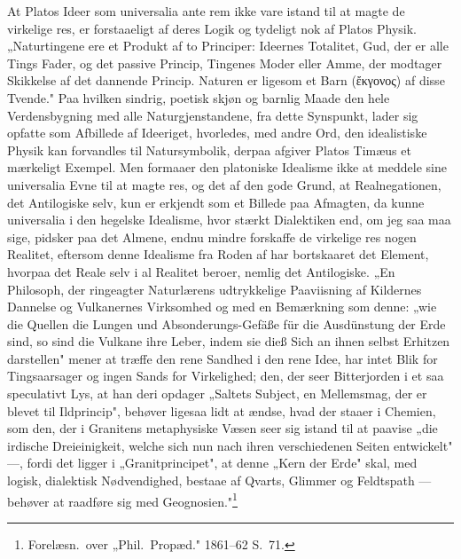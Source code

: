 \documentclass[12pt]{book}
\newcommand{\opage}[1]{\marginnote{\footnotesize\textit{[#1]}}}
\begin{document}
At Platos Ideer som universalia ante rem ikke vare istand til at magte de virkelige res, er
forstaaeligt af deres Logik og tydeligt nok af Platos Physik. „Naturtingene ere et Produkt af to
Principer: Ideernes Totalitet, Gud, der er alle Tings Fader, og det passive Princip, Tingenes
Moder eller Amme, der modtager Skikkelse af det dannende Princip. Naturen er ligesom et Barn
(ἔκγονος) af disse Tvende." Paa hvilken sindrig, poetisk skjøn og barnlig Maade den hele
Verdensbygning med alle Naturgjenstandene, fra dette Synspunkt, lader sig opfatte som Afbillede
af Ideeriget, hvorledes, med andre Ord, den idealistiske Physik kan forvandles til Natursymbolik,
derpaa afgiver Platos Timæus et mærkeligt Exempel. Men formaaer den platoniske Idealisme ikke at
meddele sine universalia Evne til at magte res, og det af den gode Grund, at Realnegationen, det
Antilogiske selv, kun er erkjendt som et Billede paa Afmagten, da kunne universalia i den
hegelske Idealisme, hvor stærkt Dialektiken end,
\opage{188} om jeg saa maa sige, pidsker paa det Almene, endnu mindre forskaffe de virkelige res nogen
Realitet, eftersom denne Idealisme fra Roden af har bortskaaret det Element, hvorpaa det Reale
selv i al Realitet beroer, nemlig det Antilogiske. „En Philosoph, der ringeagter Naturlærens
udtrykkelige Paaviisning af Kildernes Dannelse og Vulkanernes Virksomhed og med en Bemærkning som
denne: „wie die Quellen die Lungen und Absonderungs-Gefäße für die Ausdünstung der Erde sind, so
sind die Vulkane ihre Leber, indem sie dieß Sich an ihnen selbst Erhitzen darstellen" mener at
træffe den rene Sandhed i den rene Idee, har intet Blik for Tingsaarsager og ingen Sands for
Virkelighed; den, der seer Bitterjorden i et saa speculativt Lys, at han deri opdager „Saltets
Subject, en Mellemsmag, der er blevet til Ildprincip", behøver ligesaa lidt at ændse, hvad der
staaer i Chemien, som den, der i Granitens metaphysiske Væsen seer sig istand til at paavise „die
irdische Dreieinigkeit, welche sich nun nach ihren verschiedenen Seiten entwickelt" ---, fordi det
ligger i „Granitprincipet", at denne „Kern der Erde" skal, med logisk, dialektisk Nødvendighed,
bestaae af Qvarts, Glimmer og Feldtspath --- behøver at raadføre sig med
Geognosien."\footnote{Forelæsn.\ over „Phil.\ Propæd." 1861--62 S.~71.}
\end{document}
